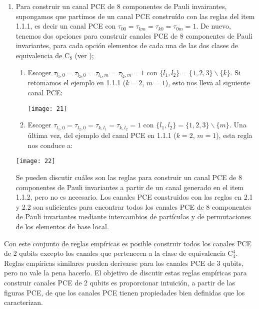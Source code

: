 \begin{enumerate}
	\item Para construir un canal PCE de 8 componentes de Pauli invairantes, 
	supongamos que partimos de un canal PCE construído con las reglas 
	del item 1.1.1, es decir un canal PCE con 
	$\tau_{00}=\tau_{km}=\tau_{k0}=\tau_{0m}=1$.
	De nuevo, tenemos dos opciones para construir canales PCE de 8 componentes 
	de Pauli invariantes, para cada opción 
	elementos de cada una de las dos clases de equivalencia 
	de C${}_8$ (ver );
	\begin{enumerate}	
	\item Escoger $\tau_{l_1,0}=\tau_{l_2,0}=\tau_{l_1,m}=\tau_{l_2,m}=1$
	con $\{l_1,l_2\}= \{1,2,3 \}\backslash\{k \}$. Si retomamos el ejemplo en 1.1.1
	($k=2$, $m=1$), 
	esto nos lleva al siguiente canal PCE:
	\begin{center}
				\texttt{[image: 21]}
			\end{center}
	\item Escoger $\tau_{l_1,0}=\tau_{l_2,0}=\tau_{k,l_1}=\tau_{k,l_2}=1$
	con $\{l_1,l_2\}=\{1,2,3 \}\backslash\{m \}$. Una última vez, del ejemplo 
	del canal PCE en 1.1.1 ($k=2$, $m=1$), esta regla nos conduce a:
	\end{enumerate}
	\begin{center}
			\texttt{[image: 22]}
	\end{center}
	Se pueden discutir cuáles son las reglas para construir un canal PCE de 8 componentes 
	de Pauli invariantes a partir de un canal generado en el item 1.1.2, pero no es 
	necesario. Los canales PCE construidos con las reglas en 2.1 y 2.2 son 
	suficientes para encontrar todos los canales PCE de 8 componentes de Pauli 
	invariantes mediante intercambios de partículas y de permutaciones de los 
	elementos de base local.
\end{enumerate}
Con este conjunto de reglas empíricas es posible construir todos
los canales PCE de 2 qubits excepto los canales que pertenecen
a la clase de equivalencia C${}_4^4$. Reglas empíricas similares pueden 
derivarse para los canales PCE de 3 qubits, pero no vale la pena hacerlo.
El objetivo de discutir estas reglas empíricas para construir canales PCE de 2 qubits 
es proporcionar intuición, a partir de las figuras PCE, de que los canales PCE
tienen propiedades bien definidas que los caracterizan.


